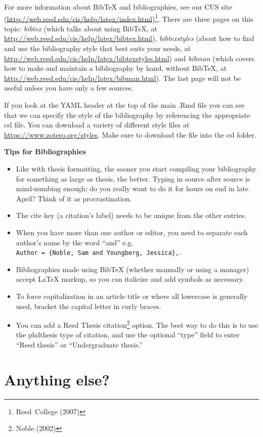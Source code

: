 \documentclass [11pt, proquest] {uwthesis}[2015/03/03]
\providecommand{\tightlist}{%
  \setlength{\itemsep}{0pt}\setlength{\parskip}{0pt}}
\begin{document}
For more information about BibTeX and bibliographies, see our CUS site
(\url{http://web.reed.edu/cis/help/latex/index.html})\footnote{Reed~College
  (2007)}. There are three pages on this topic: \emph{bibtex} (which
talks about using BibTeX, at
\url{http://web.reed.edu/cis/help/latex/bibtex.html}),
\emph{bibtexstyles} (about how to find and use the bibliography style
that best suits your needs, at
\url{http://web.reed.edu/cis/help/latex/bibtexstyles.html}) and
\emph{bibman} (which covers how to make and maintain a bibliography by
hand, without BibTeX, at
\url{http://web.reed.edu/cis/help/latex/bibman.html}). The last page
will not be useful unless you have only a few sources.

If you look at the YAML header at the top of the main .Rmd file you can
see that we can specify the style of the bibliography by referencing the
appropriate csl file. You can download a variety of different style
files at \url{https://www.zotero.org/styles}. Make sure to download the
file into the csl folder.

\textbf{Tips for Bibliographies}
\begin{itemize}
\tightlist
\item
  Like with thesis formatting, the sooner you start compiling your
  bibliography for something as large as thesis, the better. Typing in
  source after source is mind-numbing enough; do you really want to do
  it for hours on end in late April? Think of it as procrastination.
\item
  The cite key (a citation's label) needs to be unique from the other
  entries.
\item
  When you have more than one author or editor, you need to separate
  each author's name by the word ``and'' e.g.
  \texttt{Author\ =\ \{Noble,\ Sam\ and\ Youngberg,\ Jessica\},}.
\item
  Bibliographies made using BibTeX (whether manually or using a manager)
  accept LaTeX markup, so you can italicize and add symbols as
  necessary.
\item
  To force capitalization in an article title or where all lowercase is
  generally used, bracket the capital letter in curly braces.
\item
  You can add a Reed Thesis citation\footnote{Noble (2002)} option. The
  best way to do this is to use the phdthesis type of citation, and use
  the optional ``type'' field to enter ``Reed thesis'' or
  ``Undergraduate thesis.''
\end{itemize}
\section{Anything else?}\label{anything-else}
\end{document}
